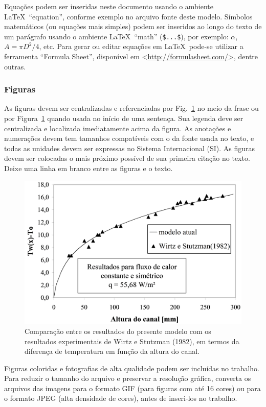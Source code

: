 \documentclass[%
  article,%
  10pt,%
  a4paper,%
  fleqn,%
  oneside,%
  sumario = tradicional,%
  chapter = TITLE,%
  section = TITLE,%
]{abntex2}
\begin{document}
Equações podem ser inseridas neste documento usando o ambiente \LaTeX\ ``equation'', conforme exemplo no arquivo fonte deste modelo. Símbolos matemáticos (ou equações mais simples) podem ser inseridos ao longo do texto de um parágrafo usando o ambiente \LaTeX\ ``math'' (\verb|$...$|), por exemplo: $\alpha$, $A = \pi D^{2} /4$, etc. Para gerar ou editar equações em \LaTeX\ pode-se utilizar a ferramenta ``Formula Sheet'', disponível em <\url{http://formulasheet.com/}>, dentre outras.

\subsubsection{Figuras}\label{sssec:figs}

As figuras devem ser centralizadas e referenciadas por Fig.~\ref{fig:grafico} no meio da frase ou por Figura~\ref{fig:grafico} quando usada no início de uma sentença. Sua legenda deve ser centralizada e localizada imediatamente acima da figura. As anotações e numerações devem tem tamanhos compatíveis com o da fonte usada no texto, e todas as unidades devem ser expressas no Sistema Internacional (SI). As figuras devem ser colocadas o mais próximo possível de sua primeira citação no texto. Deixe uma linha em branco entre as figuras e o texto.

\begin{figure}[!htb]
\centering
\caption{Comparação entre os resultados do presente modelo com os resultados experimentais de Wirtz e Stutzman (1982), em termos da diferença de temperatura em função da altura do canal.}
\label{fig:grafico}
\includegraphics[width = 0.5\columnwidth]{./Figuras/grafico}
\end{figure}

Figuras coloridas e fotografias de alta qualidade podem ser incluídas no trabalho. Para reduzir o tamanho do arquivo e preservar a resolução gráfica, converta os arquivos das imagens para o formato GIF (para figuras com até 16 cores) ou para o formato JPEG (alta densidade de cores), antes de inseri-los no trabalho.
\end{document}
